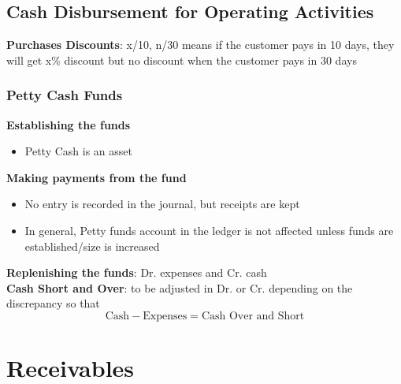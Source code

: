 \documentclass{article}
\begin{document}
\begin{multicols}{2}
\subsection{Cash Disbursement for Operating Activities}
\textbf{Purchases Discounts}: x/10, n/30 means if the customer pays in 10 days, they will get x\% discount but no discount when the customer pays in 30 days
\subsubsection{Petty Cash Funds}
\textbf{Establishing the funds}
\begin{itemize}
	\item Petty Cash is an asset
\end{itemize}
\textbf{Making payments from the fund}
\begin{itemize}
	\item No entry is recorded in the journal, but receipts are kept
	\item In general, Petty funds account in the ledger is not affected unless funds are established/size is increased
\end{itemize}
\textbf{Replenishing the funds}: Dr. expenses and Cr. cash\\
\textbf{Cash Short and Over}: to be adjusted in Dr. or Cr. depending on the discrepancy so that
$$\text{Cash} - \text{Expenses} = \text{Cash Over and Short}$$

\section{Receivables}

\end{multicols}
\end{document}
